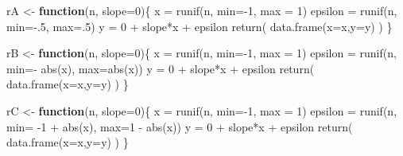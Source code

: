 \documentclass[
]{book}
\newenvironment{Shaded}{\begin{snugshade}}{\end{snugshade}}
\newcommand{\AttributeTok}[1]{\textcolor[rgb]{0.77,0.63,0.00}{#1}}
\newcommand{\ControlFlowTok}[1]{\textcolor[rgb]{0.13,0.29,0.53}{\textbf{#1}}}
\newcommand{\DecValTok}[1]{\textcolor[rgb]{0.00,0.00,0.81}{#1}}
\newcommand{\FunctionTok}[1]{\textcolor[rgb]{0.00,0.00,0.00}{#1}}
\newcommand{\NormalTok}[1]{#1}
\newcommand{\OtherTok}[1]{\textcolor[rgb]{0.56,0.35,0.01}{#1}}
\newcommand{\SpecialCharTok}[1]{\textcolor[rgb]{0.00,0.00,0.00}{#1}}
\theoremstyle{definition}
\theoremstyle{definition}
\theoremstyle{definition}
\theoremstyle{definition}
\theoremstyle{remark}
\begin{document}
\begin{Shaded}
\begin{Highlighting}[]
\NormalTok{rA }\OtherTok{\textless{}{-}} \ControlFlowTok{function}\NormalTok{(n, }\AttributeTok{slope=}\DecValTok{0}\NormalTok{)\{}
\NormalTok{  x       }\OtherTok{=} \FunctionTok{runif}\NormalTok{(n, }\AttributeTok{min=}\SpecialCharTok{{-}}\DecValTok{1}\NormalTok{, }\AttributeTok{max =} \DecValTok{1}\NormalTok{)}
\NormalTok{  epsilon }\OtherTok{=} \FunctionTok{runif}\NormalTok{(n, }\AttributeTok{min=}\SpecialCharTok{{-}}\NormalTok{.}\DecValTok{5}\NormalTok{, }\AttributeTok{max=}\NormalTok{.}\DecValTok{5}\NormalTok{)}
\NormalTok{  y       }\OtherTok{=} \DecValTok{0} \SpecialCharTok{+}\NormalTok{ slope}\SpecialCharTok{*}\NormalTok{x }\SpecialCharTok{+}\NormalTok{ epsilon}
  \FunctionTok{return}\NormalTok{( }\FunctionTok{data.frame}\NormalTok{(}\AttributeTok{x=}\NormalTok{x,}\AttributeTok{y=}\NormalTok{y) )}
\NormalTok{\}}

\NormalTok{rB }\OtherTok{\textless{}{-}} \ControlFlowTok{function}\NormalTok{(n, }\AttributeTok{slope=}\DecValTok{0}\NormalTok{)\{}
\NormalTok{  x       }\OtherTok{=} \FunctionTok{runif}\NormalTok{(n, }\AttributeTok{min=}\SpecialCharTok{{-}}\DecValTok{1}\NormalTok{, }\AttributeTok{max =} \DecValTok{1}\NormalTok{)}
\NormalTok{  epsilon }\OtherTok{=} \FunctionTok{runif}\NormalTok{(n, }\AttributeTok{min=}\SpecialCharTok{{-}} \FunctionTok{abs}\NormalTok{(x), }\AttributeTok{max=}\FunctionTok{abs}\NormalTok{(x))}
\NormalTok{  y       }\OtherTok{=} \DecValTok{0} \SpecialCharTok{+}\NormalTok{ slope}\SpecialCharTok{*}\NormalTok{x }\SpecialCharTok{+}\NormalTok{ epsilon}
  \FunctionTok{return}\NormalTok{( }\FunctionTok{data.frame}\NormalTok{(}\AttributeTok{x=}\NormalTok{x,}\AttributeTok{y=}\NormalTok{y) )}
\NormalTok{\}}

\NormalTok{rC }\OtherTok{\textless{}{-}} \ControlFlowTok{function}\NormalTok{(n, }\AttributeTok{slope=}\DecValTok{0}\NormalTok{)\{}
\NormalTok{  x       }\OtherTok{=} \FunctionTok{runif}\NormalTok{(n, }\AttributeTok{min=}\SpecialCharTok{{-}}\DecValTok{1}\NormalTok{, }\AttributeTok{max =} \DecValTok{1}\NormalTok{)}
\NormalTok{  epsilon }\OtherTok{=} \FunctionTok{runif}\NormalTok{(n, }\AttributeTok{min=} \SpecialCharTok{{-}}\DecValTok{1} \SpecialCharTok{+} \FunctionTok{abs}\NormalTok{(x), }\AttributeTok{max=}\DecValTok{1} \SpecialCharTok{{-}} \FunctionTok{abs}\NormalTok{(x))}
\NormalTok{  y       }\OtherTok{=} \DecValTok{0} \SpecialCharTok{+}\NormalTok{ slope}\SpecialCharTok{*}\NormalTok{x }\SpecialCharTok{+}\NormalTok{ epsilon}
  \FunctionTok{return}\NormalTok{( }\FunctionTok{data.frame}\NormalTok{(}\AttributeTok{x=}\NormalTok{x,}\AttributeTok{y=}\NormalTok{y) )}
\NormalTok{\}}
\end{Highlighting}
\end{Shaded}
\end{document}
